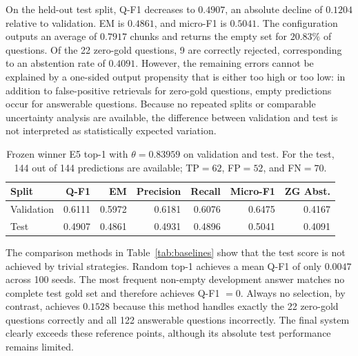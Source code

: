 \documentclass[11pt]{article}
\begin{document}
On the held-out test split, Q-F1 decreases to $0.4907$, an absolute decline of $0.1204$ relative to validation. EM is $0.4861$, and micro-F1 is $0.5041$. The configuration outputs an average of $0.7917$ chunks and returns the empty set for $20.83\%$ of questions. Of the 22 zero-gold questions, 9 are correctly rejected, corresponding to an abstention rate of $0.4091$. However, the remaining errors cannot be explained by a one-sided output propensity that is either too high or too low: in addition to false-positive retrievals for zero-gold questions, empty predictions occur for answerable questions. Because no repeated splits or comparable uncertainty analysis are available, the difference between validation and test is not interpreted as statistically expected variation.

\begin{table}[t]
\centering
\small
\begin{tabular}{lrrrrrr}
\toprule
\textbf{Split} & \textbf{Q-F1} & \textbf{EM} & \textbf{Precision} & \textbf{Recall} & \textbf{Micro-F1} & \textbf{ZG Abst.} \\
\midrule
Validation & 0.6111 & 0.5972 & 0.6181 & 0.6076 & 0.6475 & 0.4167 \\
Test         & 0.4907 & 0.4861 & 0.4931 & 0.4896 & 0.5041 & 0.4091 \\
\bottomrule
\end{tabular}
\caption{Frozen winner E5 top-1 with $\theta=0.83959$ on validation and test. For the test, 144 out of 144 predictions are available; TP${}=62$, FP${}=52$, and FN${}=70$.}
\label{tab:final-system}
\end{table}

The comparison methods in Table~\ref{tab:baselines} show that the test score is not achieved by trivial strategies. Random top-1 achieves a mean Q-F1 of only $0.0047$ across 100 seeds. The most frequent non-empty development answer matches no complete test gold set and therefore achieves Q-F1 $=0$. Always no selection, by contrast, achieves $0.1528$ because this method handles exactly the 22 zero-gold questions correctly and all 122 answerable questions incorrectly. The final system clearly exceeds these reference points, although its absolute test performance remains limited.
\end{document}

